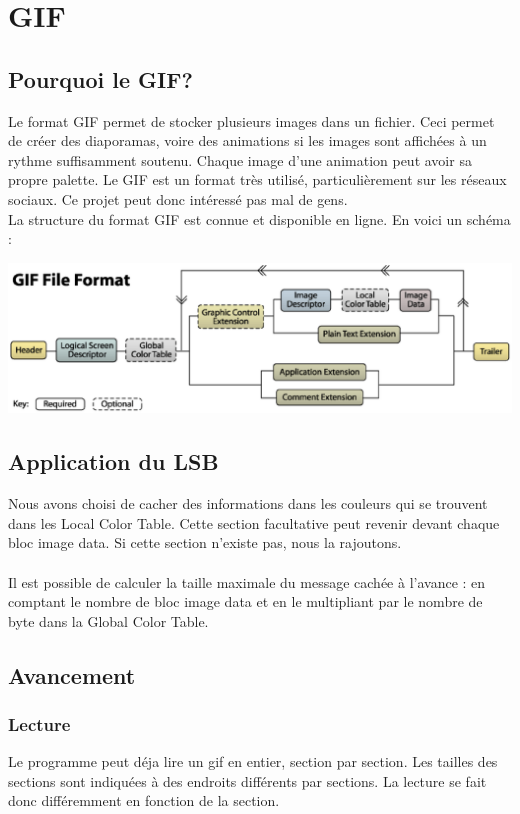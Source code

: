 \section{GIF}

\subsection{Pourquoi le GIF?}
Le format GIF permet de stocker plusieurs images dans un fichier. 
Ceci permet de créer des diaporamas, voire des animations si les images sont affichées à un rythme suffisamment soutenu. 
Chaque image d'une animation peut avoir sa propre palette.
Le GIF est un format très utilisé, particulièrement sur les réseaux sociaux. 
Ce projet peut donc intéressé pas mal de gens.\\
La structure du format GIF est connue et disponible en ligne. En voici un schéma :

\vspace{1.5cm}

\includegraphics[width=15cm]{gif_structure.eps}


\subsection{Application du LSB}
Nous avons choisi de cacher des informations dans les couleurs qui se trouvent dans les Local Color Table. 
Cette section facultative peut revenir devant chaque bloc image data. Si cette section n'existe pas, nous la rajoutons.\\\\

Il est possible de calculer la taille maximale du message cachée à l'avance : 
en comptant le nombre de bloc image data et en le multipliant par le nombre de byte dans la Global Color Table.


\subsection{Avancement}
\subsubsection{Lecture}
Le programme peut déja lire un gif en entier, section par section. 
Les tailles des sections sont indiquées à des endroits différents par sections. 
La lecture se fait donc différemment en fonction de la section.\\\\

